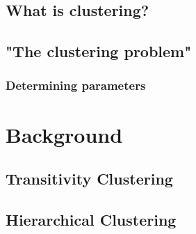 \documentclass[a4paper,10pt]{article}
\begin{document}
\subsection{What is clustering?}

\subsection{"The clustering problem"}

\subsubsection{Determining parameters}


\newpage
\section{Background}

\subsection{Transitivity Clustering}

\subsection{Hierarchical Clustering}
\end{document}
